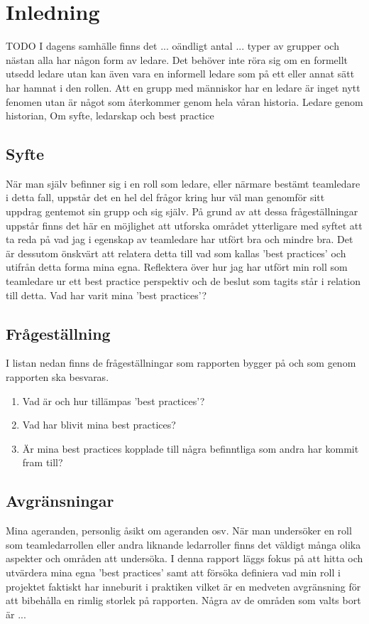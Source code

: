 \section{Inledning}
TODO
I dagens samhälle finns det ... oändligt antal ... typer av grupper och nästan alla har någon form av ledare. Det behöver inte röra sig om en formellt utsedd ledare utan kan även vara en informell ledare som på ett eller annat sätt har hamnat i den rollen. Att en grupp med människor har en ledare är inget nytt fenomen utan är något som återkommer genom hela våran historia. 
\newline \newline
Ledare genom historian, Om syfte, ledarskap och best practice

\subsection{Syfte}
När man själv befinner sig i en roll som ledare, eller närmare bestämt teamledare i detta fall, uppstår det en hel del frågor kring hur väl man genomför sitt uppdrag gentemot sin grupp och sig själv. På grund av att dessa frågeställningar uppstår finns det här en möjlighet att utforska området ytterligare med syftet att ta reda på vad jag i egenskap av teamledare har utfört bra och mindre bra. Det är dessutom önskvärt att relatera detta till vad som kallas 'best practices' och utifrån detta forma mina egna.
\newline \newline
Reflektera över hur jag har utfört min roll som teamledare ur ett best practice perspektiv och de beslut som tagits står i relation till detta. Vad har varit mina 'best practices'?

\subsection{Frågeställning}
I listan nedan finns de frågeställningar som rapporten bygger på och som genom rapporten ska besvaras.
	\begin{enumerate}
		\item Vad är och hur tillämpas 'best practices'?
		\item Vad har blivit mina best practices?
		\item Är mina best practices kopplade till några befinntliga som andra har kommit fram till?
	\end{enumerate}

\subsection{Avgränsningar}
Mina ageranden, personlig åsikt om ageranden osv. \newline
När man undersöker en roll som teamledarrollen eller andra liknande ledarroller finns det väldigt många olika aspekter och områden att undersöka. I denna rapport läggs fokus på att hitta och utvärdera mina egna 'best practices' samt att försöka definiera vad min roll i projektet faktiskt har inneburit i praktiken vilket är en medveten avgränsning för att bibehålla en rimlig storlek på rapporten.
\newline \newline
Några av de områden som valts bort är ...
